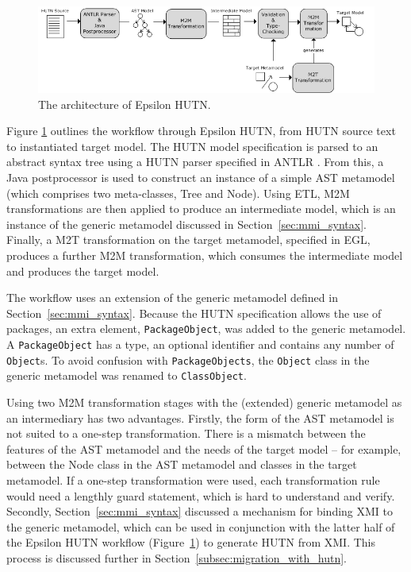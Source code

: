 \begin{figure}[htbp]
  \begin{center}
    \leavevmode
    \includegraphics[scale=0.44]{5.Implementation/hutn_workflow.png}
  \end{center}
  \caption{The architecture of Epsilon HUTN.}
  \label{fig:architecture}
\end{figure}

Figure \ref{fig:architecture} outlines the workflow through Epsilon HUTN, from HUTN source text to instantiated target model. The HUTN model specification is parsed to an abstract syntax tree using a HUTN parser specified in ANTLR \cite{parr07antlr}. From this, a Java postprocessor is used to construct an instance of a simple AST metamodel (which comprises two meta-classes, Tree and Node). Using ETL, M2M transformations are then applied to produce an intermediate model, which is an instance of the generic metamodel discussed in Section~\ref{sec:mmi_syntax}. Finally, a M2T transformation on the target metamodel, specified in EGL, produces a further M2M transformation, which consumes the intermediate model and produces the target model.

The workflow uses an extension of the generic metamodel defined in Section~\ref{sec:mmi_syntax}. Because the HUTN specification allows the use of packages, an extra element, \texttt{PackageObject}, was added to the generic metamodel. A \texttt{PackageObject} has a type, an optional identifier and contains any number of \texttt{Object}s. To avoid confusion with \texttt{PackageObjects}, the \texttt{Object} class in the generic metamodel was renamed to \texttt{ClassObject}.

Using two M2M transformation stages with the (extended) generic metamodel as an intermediary has two advantages. Firstly, the form of the AST metamodel is not suited to a one-step transformation. There is a mismatch between the features of the AST metamodel and the needs of the target model -- for example, between the Node class in the AST metamodel and classes in the target metamodel. If a one-step transformation were used, each transformation rule would need a lengthly guard statement, which is hard to understand and verify. Secondly, Section~\ref{sec:mmi_syntax} discussed a mechanism for binding XMI to the generic metamodel, which can be used in conjunction with the latter half of the Epsilon HUTN workflow (Figure~\ref{fig:architecture}) to generate HUTN from XMI. This process is discussed further in Section~\ref{subsec:migration_with_hutn}.

